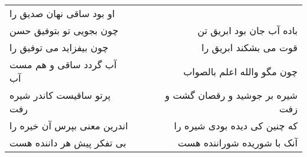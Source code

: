 \begin{center}
\begin{longtable}{l p{0.5cm} r}
او بود ساقی نهان صدیق را
\\
چون بجویی تو بتوفیق حسن
&&
باده آب جان بود ابریق تن
\\
چون بیفزاید می توفیق را
&&
قوت می بشکند ابریق را
\\
آب گردد ساقی و هم مست آب
&&
چون مگو والله اعلم بالصواب
\\
پرتو ساقیست کاندر شیره رفت
&&
شیره بر جوشید و رقصان گشت و زفت
\\
اندرین معنی بپرس آن خیره را
&&
که چنین کی دیده بودی شیره را
\\
بی تفکر پیش هر داننده هست
&&
آنک با شوریده شوراننده هست
\\
\end{longtable}
\end{center}
